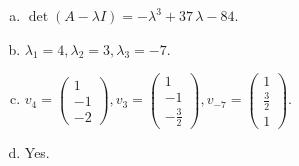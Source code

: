 \begin{questions}
\begin{solution}
\begin{enumerate}[(a)]
\item $\det(A-\lambda I)=-{\lambda}^{3} + 37 \, {\lambda} - 84$.
\item ${\lambda}_1=4, {\lambda}_2=3, {\lambda}_3=-7$.
\item $v_{4}=\left(\begin{array}{r}
1 \\
-1 \\
-2
\end{array}\right), v_{3}=\left(\begin{array}{r}
1 \\
-1 \\
-\frac{3}{2}
\end{array}\right), v_{-7}=\left(\begin{array}{r}
1 \\
\frac{3}{2} \\
1
\end{array}\right)$.
\item Yes.
\end{enumerate}
\end{solution}

\end{questions}

\newpage


\begin{center}
\end{center}

